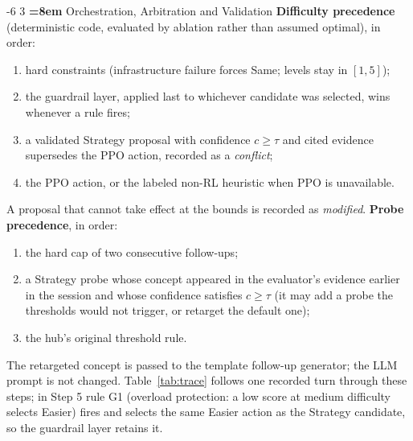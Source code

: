 \documentclass[runningheads,a4paper]{llncs}
\makeatletter
\renewcommand\section{\@startsection{section}{1}{\z@}%
                       {-6\p@ \@plus -1\p@ \@minus -1\p@}%
                       {3\p@ \@plus 1\p@ \@minus 1\p@}%
                       {\normalfont\large\bfseries\boldmath
                        \rightskip=\z@ \@plus 8em\pretolerance=10000 }}
\makeatother
\begin{document}
\section{Orchestration, Arbitration and Validation}
\textbf{Difficulty precedence} (deterministic code, evaluated by ablation rather than assumed optimal), in order:
\begin{enumerate}\setlength{\itemsep}{0pt}\setlength{\topsep}{2pt}
\item hard constraints (infrastructure failure forces Same; levels stay in $[1,5]$);
\item the guardrail layer, applied last to whichever candidate was selected, wins whenever a rule fires;
\item a validated Strategy proposal with confidence $c\ge\tau$ and cited evidence supersedes the PPO action, recorded as a \emph{conflict};
\item the PPO action, or the labeled non-RL heuristic when PPO is unavailable.
\end{enumerate}
A proposal that cannot take effect at the bounds is recorded as \emph{modified}. \textbf{Probe precedence}, in order:
\begin{enumerate}\setlength{\itemsep}{0pt}\setlength{\topsep}{2pt}
\item the hard cap of two consecutive follow-ups;
\item a Strategy probe whose concept appeared in the evaluator's evidence earlier in the session and whose confidence satisfies $c\ge\tau$ (it may add a probe the thresholds would not trigger, or retarget the default one);
\item the hub's original threshold rule.
\end{enumerate}
The retargeted concept is passed to the template follow-up generator; the LLM prompt is not changed. Table~\ref{tab:trace} follows one recorded turn through these steps; in Step 5 rule G1 (overload protection: a low score at medium difficulty selects Easier) fires and selects the same Easier action as the Strategy candidate, so the guardrail layer retains it.
\end{document}

